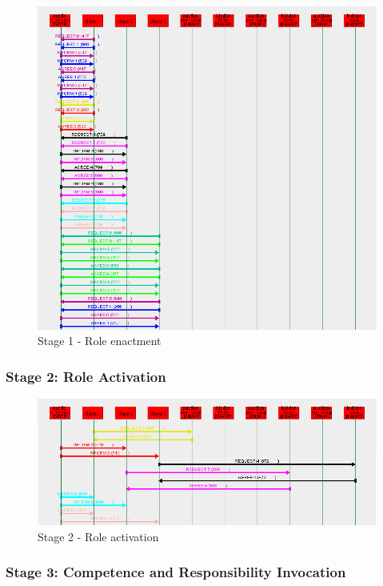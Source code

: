 \begin{figure}[H]
	\centering
	\includegraphics[width=\textwidth]{images/example3-stage1.png}
	\caption{Stage 1 - Role enactment}
	\label{figure:example3-stage1}
\end{figure}

\subsubsection*{Stage 2: Role Activation}

\begin{figure}[H]
	\centering
	\includegraphics[width=\textwidth]{images/example3-stage2.png}
	\caption{Stage 2 - Role activation}
	\label{figure:example3-stage2}
\end{figure}

\subsubsection*{Stage 3: Competence and Responsibility Invocation}


